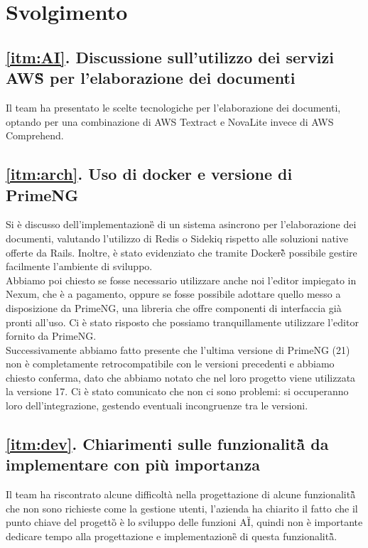 \documentclass[a4paper,12pt]{article}
\begin{document}
\newpage
\section{Svolgimento}

\subsection*{\ref{itm:AI}. Discussione sull'utilizzo dei servizi AWS\G{} per l'elaborazione dei documenti}
Il team ha presentato le scelte tecnologiche per l'elaborazione dei documenti, optando per una combinazione di AWS Textract e NovaLite invece di AWS Comprehend.

\subsection*{\ref{itm:arch}. Uso di docker e versione di PrimeNG}

Si è discusso dell'implementazione\G{} di un sistema asincrono per l'elaborazione dei documenti, valutando l'utilizzo di Redis o Sidekiq rispetto alle soluzioni native offerte da Rails. Inoltre, è stato evidenziato che tramite Docker\G è possibile gestire facilmente l'ambiente di sviluppo.\\
Abbiamo poi chiesto se fosse necessario utilizzare anche noi l'editor impiegato in Nexum, che è a pagamento, oppure se fosse possibile adottare quello messo a disposizione da PrimeNG, una libreria che offre componenti di interfaccia già pronti all'uso. Ci è stato risposto che possiamo tranquillamente utilizzare l'editor fornito da PrimeNG.\\
Successivamente abbiamo fatto presente che l'ultima versione di PrimeNG (21) non è completamente retrocompatibile con le versioni precedenti e abbiamo chiesto conferma, dato che abbiamo notato che nel loro progetto viene utilizzata la versione 17. Ci è stato comunicato che non ci sono problemi: si occuperanno loro dell'integrazione, gestendo eventuali incongruenze tra le versioni.\\

\subsection*{\ref{itm:dev}. Chiarimenti sulle funzionalità\G{} da implementare con più importanza}
Il team ha riscontrato alcune difficoltà nella progettazione di alcune funzionalità\G{} che non sono richieste come la gestione utenti, 
l'azienda ha chiarito il fatto che il punto chiave del progetto\G{} è lo sviluppo delle funzioni AI\G{}, quindi non è importante dedicare tempo alla progettazione e implementazione\G{} di questa funzionalità\G{}.
\end{document}

